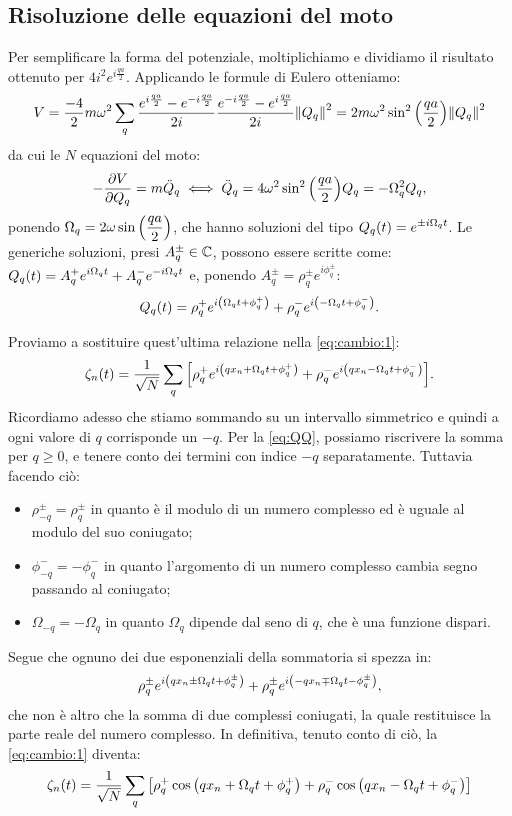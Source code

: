     \subsection{Risoluzione delle equazioni del moto}
        Per semplificare la forma del potenziale, moltiplichiamo e dividiamo il risultato ottenuto per $\displaystyle 4i^2e^{i\frac{qa}{2}}$. Applicando le formule di Eulero otteniamo: $$V=\frac{-4}{2}m\omega^2\sum_q\frac{e^{i\frac{qa}{2}}-e^{-i\frac{qa}{2}}}{2i}\frac{e^{-i\frac{qa}{2}}-e^{i\frac{qa}{2}}}{2i}\norm{Q_q}^2=2m\omega^2\sin^2\qty(\frac{qa}{2})\norm{Q_q}^2$$ da cui le $N$ equazioni del moto: $$-\pdv{V}{Q_q}=m\ddot{Q}_q \iff \ddot{Q}_q=4\omega^2\sin^2\qty(\frac{qa}{2})Q_q=-\Omega_q^2Q_q,$$ ponendo $\displaystyle\Omega_q=2\omega\sin\qty(\frac{qa}{2})$, che hanno soluzioni del tipo $\displaystyle Q_q\qty(t)=e^{\pm i\Omega_qt}$. Le generiche soluzioni, presi $A_q^\pm\in\mathbb{C}$, possono essere scritte come: $\displaystyle Q_q\qty(t)=A_q^+e^{i\Omega_qt}+A_q^-e^{-i\Omega_qt}$ e, ponendo $\displaystyle A_q^\pm=\rho_q^\pm e^{i\phi_q^\pm}$: $$Q_q\qty(t)=\rho_q^+e^{i\qty(\Omega_qt+\phi_q^+)}+\rho_q^-e^{i\qty(-\Omega_qt+\phi_q^-)}.$$
        \par Proviamo a sostituire quest'ultima relazione nella \eqref{eq:cambio:1}: $$\zeta_n\qty(t)=\frac{1}{\sqrt{N}}\sum_q\qty[\rho_q^+e^{i\qty(qx_n+\Omega_qt+\phi_q^+)}+\rho_q^-e^{i\qty(qx_n-\Omega_qt+\phi_q^-)}].$$ Ricordiamo adesso che stiamo sommando su un intervallo simmetrico e quindi a ogni valore di $q$ corrisponde un $-q$. Per la \eqref{eq:QQ}, possiamo riscrivere la somma per $q\geq 0$, e tenere conto dei termini con indice $-q$ separatamente. Tuttavia facendo ci\`o: 
        \begin{itemize}
            \item $\rho_{-q}^\pm=\rho_{q}^\pm$ in quanto \`e il modulo di un numero complesso ed \`e uguale al modulo del suo coniugato;
            \item $\phi_{-q}^-=-\phi_q^-$ in quanto l'argomento di un numero complesso cambia segno passando al coniugato;
            \item $\Omega_{-q}=-\Omega_q$ in quanto $\Omega_q$ dipende dal seno di $q$, che \`e una funzione dispari.
        \end{itemize}
        Segue che ognuno dei due esponenziali della sommatoria si spezza in: $$\rho_q^\pm e^{i\qty(qx_n\pm\Omega_qt+\phi_q^\pm)}+\rho_{q}^\pm e^{i\qty(-qx_n\mp\Omega_qt-\phi_{q}^\pm)},$$ che non \`e altro che la somma di due complessi coniugati, la quale restituisce la parte reale del numero complesso. In definitiva, tenuto conto di ci\`o, la \eqref{eq:cambio:1} diventa:
        \begin{equation}
            \zeta_n\qty(t)=\frac{1}{\sqrt{N}}\sum_q\qty[\rho_q^+\cos\qty(qx_n+\Omega_qt+\phi_q^+)+\rho_q^-\cos\qty(qx_n-\Omega_qt+\phi_q^-)]
        \end{equation}
